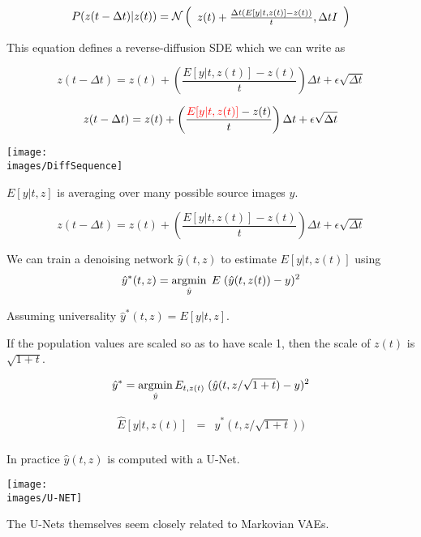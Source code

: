 {

$$P(z(t - \Delta t)|z(t)) = {\cal N}\left(\begin{array}{l} z(t) + \frac{\Delta t(E[y|t,z(t)] - z(t))}{t}, \Delta t I\end{array}\right)$$

\vfill
This equation defines a reverse-diffusion SDE which we can write as

{\huge
$$z(t - \Delta t) = z(t) + \left(\frac{E[y|t,z(t)] - z(t)}{t}\right)\Delta t +  \epsilon\sqrt{\Delta t}$$
}


{\huge
$$z(t - \Delta t) = z(t) + \left(\frac{{\color{red} E[y|t,z(t)]} - z(t)}{t}\right)\Delta t +  \epsilon\sqrt{\Delta t}$$
}

\vfill
\centerline{\texttt{[image: \\images/DiffSequence]}}

\vfill
$E[y|t,z]$ is averaging over many possible source images $y$.


$$z(t - \Delta t) = z(t) + \left(\frac{E[y|t,z(t)] - z(t)}{t}\right)\Delta t +  \epsilon\sqrt{\Delta t}$$

\vfill
We can train a denoising network $\hat{y}(t,z)$ to estimate $E[y|t,z(t)]$ using
$$\hat{y}^*(t,z) = \operatorname*{argmin}_{\hat{y}} \;E \;(\hat{y}(t,z(t)) - y)^2$$


\vfill
Assuming universality $\hat{y}^*(t,z) = E[y|t,z]$.


\vfill
If the population values are scaled so as to have scale 1, then the scale of $z(t)$ is $\sqrt{1+t}$.

\vfill
$$\hat{y}^* = \operatorname*{argmin}_{\hat{y}} E_{t,z(t)} \; (\hat{y}(t,z/\sqrt{1+t}) - y)^2$$

\vfill
\begin{eqnarray*}
\hat{E}[y|t,z(t)] & = & \hat{y}^*(t,z/\sqrt{1+t})) \\
\end{eqnarray*}


\vfill
In practice $\hat{y}(t,z)$ is computed with a U-Net.

\vfill
\centerline{\texttt{[image: \\images/U-NET]}}

\vfill
The U-Nets themselves seem closely related to Markovian VAEs.


}
